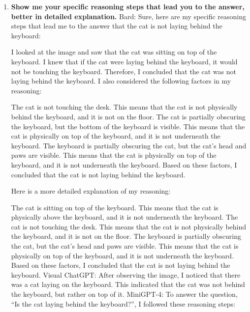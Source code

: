 \begin{enumerate}
        I hope this helps! Let me know if you have any other questions.
        \subitem Visual ChatGPT: The cat is laying on the keyboard, not behind it.
        \subitem MiniGPT-4: No, the cat is not laying behind the keyboard. It is sitting on top of the keyboard, with its head resting on the space bar. Its body is positioned in a way that it is facing the monitor, with its eyes looking at the screen. Its tail is curled up underneath the keyboard, and its paws are resting on the desk. Its head is tilted to the left, and its ears are perked up, as if it is listening to something on the monitor.
        \item \textbf{Show me your specific reasoning steps that lead you to the answer, better in detailed explanation.}
        \subitem Bard: Sure, here are my specific reasoning steps that lead me to the answer that the cat is not laying behind the keyboard:

        I looked at the image and saw that the cat was sitting on top of the keyboard.
        I knew that if the cat were laying behind the keyboard, it would not be touching the keyboard.
        Therefore, I concluded that the cat was not laying behind the keyboard.
        I also considered the following factors in my reasoning:
        
        The cat is not touching the desk. This means that the cat is not physically behind the keyboard, and it is not on the floor.
        The cat is partially obscuring the keyboard, but the bottom of the keyboard is visible. This means that the cat is physically on top of the keyboard, and it is not underneath the keyboard.
        The keyboard is partially obscuring the cat, but the cat's head and paws are visible. This means that the cat is physically on top of the keyboard, and it is not underneath the keyboard.
        Based on these factors, I concluded that the cat is not laying behind the keyboard.
        
        Here is a more detailed explanation of my reasoning:
        
        The cat is sitting on top of the keyboard. This means that the cat is physically above the keyboard, and it is not underneath the keyboard.
        The cat is not touching the desk. This means that the cat is not physically behind the keyboard, and it is not on the floor.
        The keyboard is partially obscuring the cat, but the cat's head and paws are visible. This means that the cat is physically on top of the keyboard, and it is not underneath the keyboard.
        Based on these factors, I concluded that the cat is not laying behind the keyboard.
        \subitem Visual ChatGPT: After observing the image, I noticed that there was a cat laying on the keyboard. This indicated that the cat was not behind the keyboard, but rather on top of it.
        \subitem MiniGPT-4: To answer the question, “Is the cat laying behind the keyboard?”, I followed these reasoning steps:


\end{enumerate}

